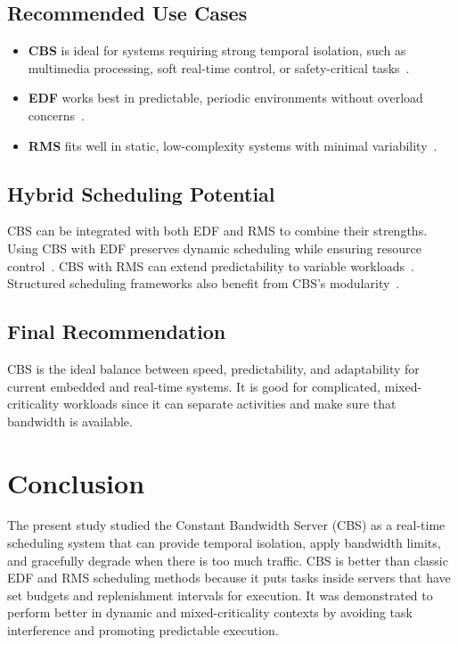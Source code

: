 \documentclass[conference]{IEEEtran}
\begin{document}
\subsection{Recommended Use Cases}

\begin{itemize}
    \item \textbf{CBS} is ideal for systems requiring strong temporal isolation, such as multimedia processing, soft real-time control, or safety-critical tasks~\cite{abeni1998integrating}.
    \item \textbf{EDF} works best in predictable, periodic environments without overload concerns~\cite{liu1973scheduling}.
    \item \textbf{RMS} fits well in static, low-complexity systems with minimal variability~\cite{buttazzo2011hard}.
\end{itemize}

\subsection{Hybrid Scheduling Potential}

CBS can be integrated with both EDF and RMS to combine their strengths. Using CBS with EDF preserves dynamic scheduling while ensuring resource control~\cite{baruah2004dynamic}. CBS with RMS can extend predictability to variable workloads~\cite{cucinotta2009providing}. Structured  scheduling frameworks also benefit from CBS’s modularity~\cite{buttazzo2011hard}.

\subsection{Final Recommendation}

CBS is the ideal balance between speed, predictability, and adaptability for current embedded and real-time systems. It is good for complicated, mixed-criticality workloads since it can separate activities and make sure that bandwidth is available.

\section{\textbf{Conclusion}}

The present study studied the Constant Bandwidth Server (CBS) as a real-time scheduling system that can provide temporal isolation, apply bandwidth limits, and gracefully degrade when there is too much traffic.  CBS is better than classic EDF and RMS scheduling methods because it puts tasks inside servers that have set budgets and replenishment intervals for execution.  It was demonstrated to perform better in dynamic and mixed-criticality contexts by avoiding task interference and promoting predictable execution.
\end{document}
